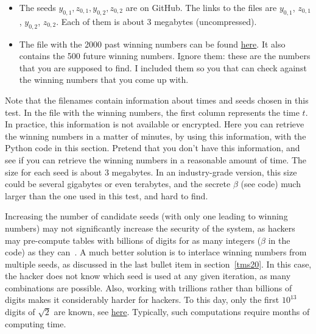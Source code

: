 \documentclass[oneside,10pt]{book}
\begin{document}
\begin{itemize}
\item The seeds $y_{0,1}, z_{0,1}, y_{0,2}, z_{0,2}$ are on GitHub. The links to the files are
 \href{https://github.com/VincentGranville/Stochastic-Processes/blob/master/lottery_seed_y10000000_2.txt}{$y_{0,1}$},
\href{https://github.com/VincentGranville/Stochastic-Processes/blob/master/lottery_seed_z10000000_2.txt}{$z_{0,1}$},
 \href{https://github.com/VincentGranville/Stochastic-Processes/blob/master/lottery_seed_y10000000_3.txt}{$y_{0,2}$},
 \href{https://github.com/VincentGranville/Stochastic-Processes/blob/master/lottery_seed_z10000000_3.txt}{$z_{0,2}$}.
Each of them is about 3 megabytes (uncompressed).
\item  The file with the 2000 past winning numbers can be found \href{https://github.com/VincentGranville/Stochastic-Processes/blob/master/lottery_winning_numbers_123903793_2.txt}{here}.
It also contains the 500 future winning numbers. Ignore them: these are the numbers that you are supposed to find. I included them so you that can check against the winning numbers that you come up with.
\end{itemize}\vspace{1ex}

\noindent Note that the filenames contain information about times and seeds chosen in this test. In the file with the winning numbers,
 the first column represents the time $t$. In practice, this information is not available or encrypted. Here you can retrieve
 the winning numbers in a matter of minutes, by using this information, with the Python code in this section. Pretend that you
 don't have this information, and see if you can retrieve the winning numbers in a reasonable amount of time. The
 size for each seed is about 3 megabytes. In an industry-grade version, this size could be several gigabytes or even terabytes, and the secrete $\beta$ (see code) much larger than the one used in this test, and hard to find.


Increasing the number of candidate seeds (with only one leading to winning numbers) may not significantly increase the security of the system, as hackers may pre-compute tables with billions of digits for as many integers ($\beta$ in the code)
as they can~\cite{rkan92}. A much better solution is to
 interlace winning numbers from multiple seeds, as discussed in the last bullet item in section~\ref{tms20}. In this case, the hacker
 does not know which seed is used at any given iteration, as many combinations are possible. Also, working with trillions rather than billions of digits makes it considerably harder for hackers. To this day, only the first $10^{13}$ digits of $\sqrt{2}$ are known, see \href{https://en.wikipedia.org/wiki/Square_root_of_2#Records_in_computation}{here}.
Typically, such computations require
 months of computing time.
\end{document}

